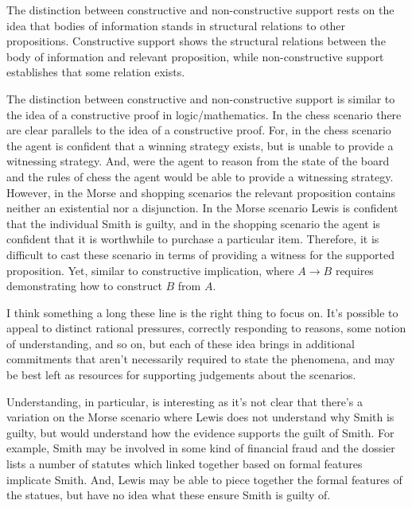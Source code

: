 \documentclass[10pt]{article}
\begin{document}
The distinction between constructive and non-constructive support rests on the idea that bodies of information stands in structural relations to other propositions.
Constructive support shows the structural relations between the body of information and relevant proposition, while non-constructive support establishes that some relation exists.


The distinction between constructive and non-constructive support is similar to the idea of a constructive proof in logic/mathematics.
In the chess scenario there are clear parallels to the idea of a constructive proof.
For, in the chess scenario the agent is confident that a winning strategy exists, but is unable to provide a witnessing strategy.
And, were the agent to reason from the state of the board and the rules of chess the agent would be able to provide a witnessing strategy.
However, in the Morse and shopping scenarios the relevant proposition contains neither an existential nor a disjunction.
In the Morse scenario Lewis is confident that the individual Smith is guilty, and in the shopping scenario the agent is confident that it is worthwhile to purchase a particular item.
Therefore, it is difficult to cast these scenario in terms of providing a witness for the supported proposition.
Yet, similar to constructive implication, where \(A \rightarrow B\) requires demonstrating how to construct \(B\) from \(A\).

\begin{note}
  I think something a long these line is the right thing to focus on.
  It's possible to appeal to distinct rational pressures, correctly responding to reasons, some notion of understanding, and so on, but each of these idea brings in additional commitments that aren't necessarily required to state the phenomena, and may be best left as resources for supporting judgements about the scenarios.

  Understanding, in particular, is interesting as it's not clear that there's a variation on the Morse scenario where Lewis does not understand why Smith is guilty, but would understand how the evidence supports the guilt of Smith.
  For example, Smith may be involved in some kind of financial fraud and the dossier lists a number of statutes which linked together based on formal features implicate Smith.
  And, Lewis may be able to piece together the formal features of the statues, but have no idea what these ensure Smith is guilty of.
\end{note}
\end{document}
